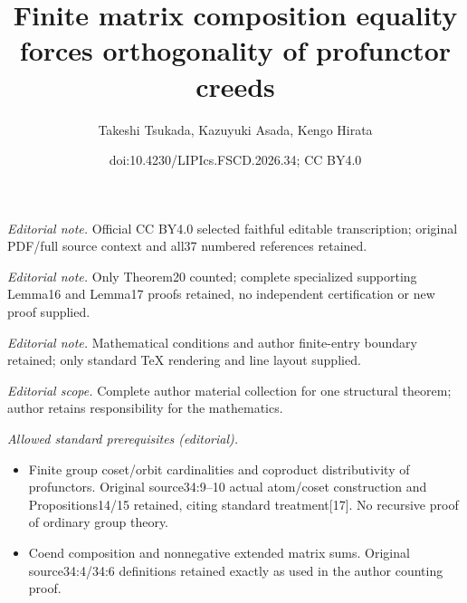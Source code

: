 \documentclass[10pt,a4paper]{article}
\title{Finite matrix composition equality forces orthogonality of profunctor creeds}
\author{Takeshi Tsukada, Kazuyuki Asada, Kengo Hirata}
\date{doi:10.4230/LIPIcs.FSCD.2026.34; CC BY4.0}
\begin{document}
\maketitle
\noindent\textit{Editorial note.} Official CC BY4.0 selected faithful editable transcription; original PDF/full source context and all37 numbered references retained.\par\medskip
\noindent\textit{Editorial note.} Only Theorem20 counted; complete specialized supporting Lemma16 and Lemma17 proofs retained, no independent certification or new proof supplied.\par\medskip
\noindent\textit{Editorial note.} Mathematical conditions and author finite-entry boundary retained; only standard TeX rendering and line layout supplied.\par\medskip
\noindent\textit{Editorial scope.} Complete author material collection for one structural theorem; author retains responsibility for the mathematics.\par\medskip
\noindent\textit{Allowed standard prerequisites (editorial).}\begin{itemize}
\item Finite group coset/orbit cardinalities and coproduct distributivity of profunctors. Original source34:9--10 actual atom/coset construction and Propositions14/15 retained, citing standard treatment[17]. No recursive proof of ordinary group theory.
\item Coend composition and nonnegative extended matrix sums. Original source34:4/34:6 definitions retained exactly as used in the author counting proof.
\end{itemize}\medskip
\end{document}
